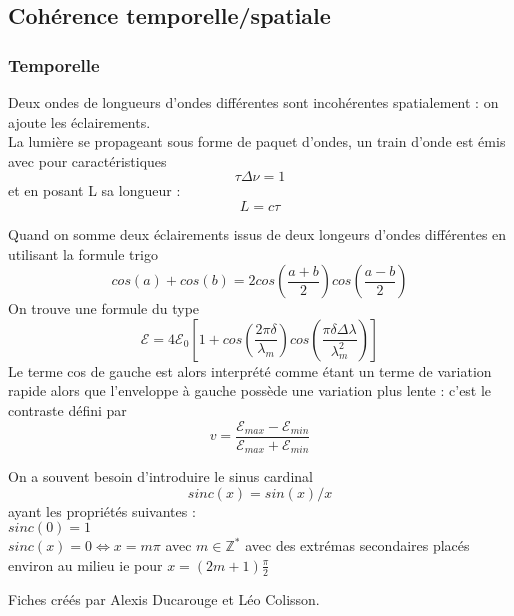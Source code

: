 \documentclass[9pt]{article}
\begin{document}
\begin{multicols*}{2}

\setlength{\columnseprule}{0.1pt}
\part{Cohérence temporelle/spatiale}
\section{Temporelle}
Deux ondes de longueurs d'ondes différentes sont incohérentes spatialement : on ajoute les éclairements.
\\
La lumière se propageant sous forme de paquet d'ondes, un train d'onde est émis avec pour caractéristiques
$$\tau \Delta\nu = 1$$
et en posant L sa longueur :
$$L = c \tau$$

Quand on somme deux éclairements issus de deux longeurs d'ondes différentes en utilisant la formule trigo
$$cos(a)+cos(b) = 2cos(\frac{a+b}{2})cos(\frac{a-b}{2})$$
On trouve une formule du type
$$\mathcal{E} = 4\mathcal{E}_0\left[1+cos\left(\frac{2\pi\delta}{\lambda_m}\right)cos\left(\frac{\pi\delta\Delta\lambda}{\lambda_m^2}\right)\right]$$
Le terme cos de gauche est alors interprété comme étant un terme de variation rapide alors que l'enveloppe à gauche possède une variation plus lente : c'est le contraste défini par
$$v = \frac{\mathcal{E}_{max}-\mathcal{E}_{min}}{\mathcal{E}_{max}+\mathcal{E}_{min}}$$


On a souvent besoin d'introduire le sinus cardinal $$sinc(x)=sin(x)/x$$ ayant les propriétés suivantes :\\
$sinc(0) = 1$\\
$sinc(x) = 0 \Leftrightarrow x = m\pi$ avec $m \in \mathbb{Z}^*$ avec des extrémas secondaires placés environ au milieu ie pour $x = (2m + 1)\frac{\pi}{2}$

\footnotesize{Fiches créés par Alexis Ducarouge et Léo Colisson.}

\end{multicols*}
\end{document}
